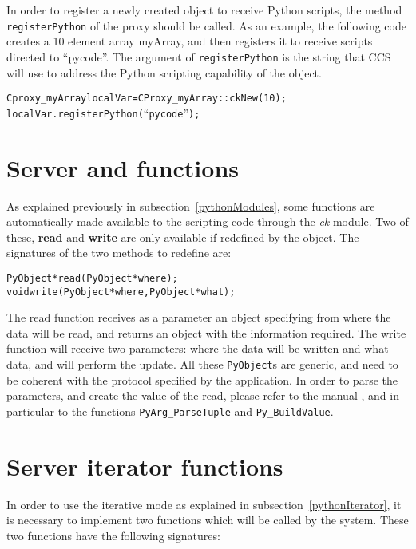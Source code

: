 In order to register a newly created object to receive Python scripts, the
method \texttt{registerPython} of the proxy should be called. As an example,
the following code creates a 10 element array myArray, and then registers it to
receive scripts directed to ``pycode''. The argument of \texttt{registerPython}
is the string that CCS will use to address the Python scripting capability of
the object.

\begin{alltt}
Cproxy_myArray localVar = CProxy_myArray::ckNew(10);
localVar.registerPython(``pycode'');
\end{alltt}


\section{Server  and  functions}
\label{pythonServerRW}

As explained previously in subsection~\ref{pythonModules}, some functions are
automatically made available to the scripting code through the {\em ck} module.
Two of these, \textbf{read} and \textbf{write} are only available if redefined
by the object. The signatures of the two methods to redefine are:

\begin{alltt}
PyObject* read(PyObject* where);
void write(PyObject* where, PyObject* what);
\end{alltt}

The read function receives as a parameter an object specifying from where the data
will be read, and returns an object with the information required. The write
function will receive two parameters: where the data will be written and what
data, and will perform the update. All these \texttt{PyObject}s are generic, and
need to be coherent with the protocol specified by the application. In order to
parse the parameters, and create the value of the read, please refer to the
manual , and in particular to the functions
\texttt{PyArg\_ParseTuple} and \texttt{Py\_BuildValue}.

\section{Server iterator functions}
\label{pythonServerIterator}

In order to use the iterative mode as explained in
subsection~\ref{pythonIterator}, it is necessary to implement two functions
which will be called by the system. These two functions have the following
signatures:

